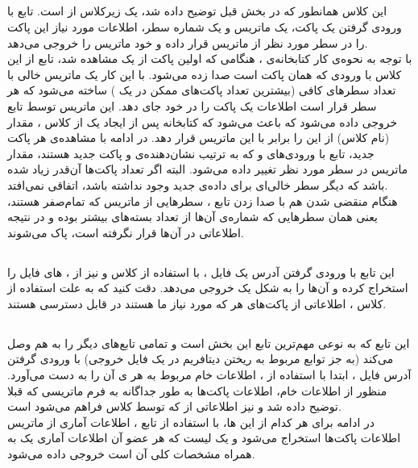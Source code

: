 \subsection{}
این کلاس همانطور که در بخش قبل توضیح داده شد، یک زیرکلاس از  است. تابع 
با ورودی گرفتن یک پاکت، یک ماتریس و یک شماره سطر، اطلاعات مورد نیاز این پاکت را در سطر مورد نظر از ماتریس قرار داده و خود ماتریس را خروجی می‌دهد.\\
با توجه به نحوه‌ی کار کتابخانه‌ی ، هنگامی که اولین پاکت از یک  مشاهده شد، تابع  از این کلاس با ورودی
که همان پاکت است صدا زده می‌شود. با این کار یک ماتریس خالی با تعداد سطر‌های کافی (بیشترین تعداد پاکت‌های ممکن در یک ) ساخته می‌شود که هر سطر قرار است اطلاعات یک پاکت را در خود جای دهد. این ماتریس توسط تابع خروجی داده می‌شود که باعث می‌شود که کتابخانه پس از ایجاد یک  از کلاس ، مقدار 
(نام کلاس) از این  را برابر با این ماتریس قرار دهد. در ادامه با مشاهده‌ی هر پاکت جدید، تابع 
با ورودی‌های
و
که به ترتیب نشان‌دهنده‌ی  و پاکت جدید هستند، مقدار ماتریس در سطر مورد نظر تغییر داده می‌شود. البته اگر تعداد پاکت‌ها آن‌قدر زیاد شده باشد که دیگر سطر خالی‌ای برای داده‌ی جدید وجود نداشته باشد، اتفاقی نمی‌افتد.\\
هنگام منقضی شدن  هم با صدا زدن تابع ، سطر‌هایی از ماتریس که تمام‌صفر هستند، یعنی همان سطر‌هایی که شماره‌ی آن‌ها از تعداد بسته‌های  بیشتر بوده و در نتیجه اطلاعاتی در آن‌ها قرار نگرفته است، پاک می‌شوند.\\
\subsection{}
این تابع با ورودی گرفتن آدرس یک فایل ، با استفاده از کلاس  و نیز 
 از 
،
‌های
فایل را استخراج کرده و آن‌ها را به شکل یک  خروجی می‌دهد. دقت کنید که به علت استفاده از کلاس
 ،
 اطلاعاتی از پاکت‌های هر  که مورد نیاز ما هستند در 
قابل دسترسی هستند.\\
\subsection{}
این تابع که به نوعی مهم‌ترین تابع این بخش است و تمامی تابع‌های دیگر را به هم وصل می‌کند (به جز توابع مربوط به ریختن دیتافریم در یک فایل خروجی) با ورودی گرفتن  آدرس فایل
،
ابتدا با استفاده از 
،
اطلاعات خام مربوط به هر 
ی
آن را به دست می‌آورد. منظور از اطلاعات خام، اطلاعات پاکت‌ها به طور جداگانه به فرم ماتریسی که قبلا توضیح داده شد و نیز اطلاعاتی از  که توسط کلاس  فراهم می‌شود است.\\
در ادامه برای هر کدام از این ‌ها، با استفاده از تابع 
،
اطلاعات آماری  از ماتریس اطلاعات پاکت‌ها استخراج می‌شود و یک لیست که هر عضو آن اطلاعات آماری یک  به همراه مشخصات کلی آن است خروجی داده می‌شود.\\
